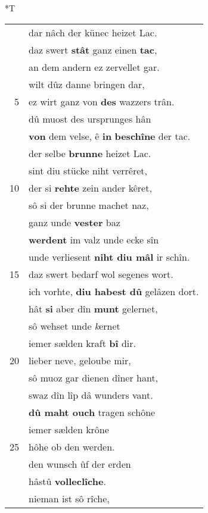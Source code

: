 \documentclass[8pt,a4paper,notitlepage]{article}
\begin{document}
\begin{table}[ht]
\begin{minipage}[t]{0.5\linewidth}
\end{minipage}
\hspace{0.5cm}
\begin{minipage}[t]{0.5\linewidth}
\small
\begin{center}*T
\end{center}
\begin{tabular}{rl}
 & dar nâch der künec heizet Lac.\\ 
 & daz swert \textbf{stât} ganz einen \textbf{tac},\\ 
 & an dem andern ez zervellet gar.\\ 
 & wilt dûz danne bringen dar,\\ 
5 & ez wirt ganz von \textbf{des} wazzers trân.\\ 
 & dû muost des ursprunges hân\\ 
 & \textbf{von} dem velse, ê \textbf{in} \textbf{beschîne} der tac.\\ 
 & der selbe \textbf{brunne} heizet Lac.\\ 
 & sint diu stücke niht verrêret,\\ 
10 & der si \textbf{rehte} zein ander kêret,\\ 
 & sô si der brunne machet naz,\\ 
 & ganz unde \textbf{vester} baz\\ 
 & \textbf{werdent} im valz unde ecke sîn\\ 
 & unde verliesent \textbf{niht diu mâl} ir schîn.\\ 
15 & daz swert bedarf wol segenes wort.\\ 
 & ich vorhte, \textbf{diu habest dû} gelâzen dort.\\ 
 & hât \textbf{si} aber dîn \textbf{munt} gelernet,\\ 
 & sô wehset unde \textit{k}ernet\\ 
 & iemer sælden kraft \textbf{bî} dir.\\ 
20 & lieber neve, geloube mir,\\ 
 & sô muoz gar dienen dîner hant,\\ 
 & swaz dîn lîp dâ wunders vant.\\ 
 & \textbf{dû maht ouch} tragen schône\\ 
 & iemer sælden krône\\ 
25 & hôhe ob den werden.\\ 
 & den wunsch ûf der erden\\ 
 & hâstû \textbf{volleclîche}.\\ 
 & nieman ist sô rîche,\\ 

\end{tabular}
\end{minipage}
\end{table}
\end{document}
